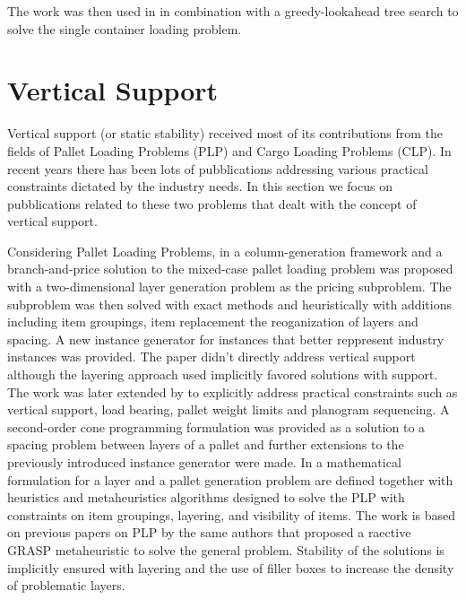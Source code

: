 \citep{martello2000three}

\citep{faroe2003guided}

\citep{lodi2002heuristic}

\citep{crainic2008extreme}

\citep{crainic2009ts2pack}

\citep{parreno2010hybrid}

\citep{WU2010347}

\citep{ZHU2012452}
The work was then used in \citep{ZHU2012408} in combination with a greedy-lookahead tree search to solve the single container loading problem.

\citep{hifi2014hybrid}

\citep{gonccalves2013biased}

\citep{zudio2018brkga}

\section{Vertical Support}
\label{sec:literature:support}%
Vertical support (or static stability) received most of its contributions from the fields of Pallet Loading Problems (PLP) and Cargo Loading Problems (CLP).
In recent years there has been lots of pubblications addressing various practical constraints dictated by the industry needs.
In this section we focus on pubblications related to these two problems that dealt with the concept of vertical support.

Considering Pallet Loading Problems, in \citep{elhedhli2019three} a column-generation framework and a branch-and-price solution to the mixed-case pallet loading problem was proposed with a two-dimensional layer generation problem as the pricing subproblem.
The subproblem was then solved with exact methods and heuristically with additions including item groupings, item replacement the reoganization of layers and spacing.
A new instance generator for instances that better reppresent industry instances was provided. The paper didn't directly address vertical support although the layering approach used implicitly favored solutions with support.
The work was later extended by \citep{GZARA20201062} to explicitly address practical constraints such as vertical support, load bearing, pallet weight limits and planogram sequencing.
A second-order cone programming formulation was provided as a solution to a spacing problem between layers of a pallet and further extensions to the previously introduced instance generator were made.
In \citep{Calzavara2021} a mathematical formulation for a layer and a pallet generation problem are defined together with heuristics and metaheuristics algorithms designed to solve the PLP with constraints on item groupings, layering, and visibility of items.
The work is based on previous papers on PLP by the same authors \citep{Iori2020a, Iori2020b, Iori2021} that proposed a raective GRASP metaheuristic to solve the general problem.
Stability of the solutions is implicitly ensured with layering and the use of filler boxes to increase the density of problematic layers.

